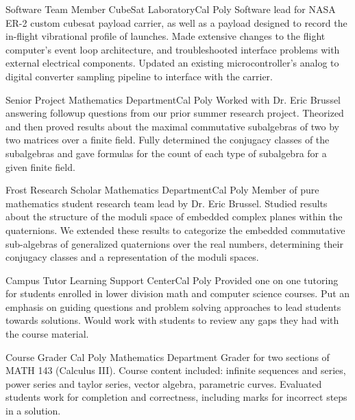 \documentclass[letterpaper, 11pt, sans]{moderncv}
\begin{document}
        {Software Team Member}
        {CubeSat Laboratory}{Cal Poly}{}
        {
            Software lead for NASA ER-2 custom cubesat payload carrier, as well as a payload designed to record the in-flight vibrational profile of launches.
            Made extensive changes to the flight computer's event loop architecture, and troubleshooted interface problems with external electrical components.
            Updated an existing microcontroller's analog to digital converter sampling pipeline to interface with the carrier.
        }

        {Senior Project}
        {Mathematics Department}{Cal Poly}{}
        {
            Worked with Dr. Eric Brussel answering followup questions from our prior summer research project.
            Theorized and then proved results about the maximal commutative subalgebras of two by two matrices over a finite field.
            Fully determined the conjugacy classes of the subalgebras and gave formulas for the count of each type of subalgebra for a given finite field.
        }

        {Frost Research Scholar}
        {Mathematics Department}{Cal Poly}{}
        {
            Member of pure mathematics student research team lead by Dr. Eric Brussel.
            Studied results about the structure of the moduli space of embedded complex planes within the quaternions.
            We extended these results to categorize the embedded commutative sub-algebras of generalized quaternions over the real numbers, determining their conjugacy classes and a representation of the moduli spaces.
        }

        {Campus Tutor}
        {Learning Support Center}{Cal Poly}{}
        {
            Provided one on one tutoring for students enrolled in lower division math and computer science courses.
            Put an emphasis on guiding questions and problem solving approaches to lead students towards solutions.
            Would work with students to review any gaps they had with the course material.
        }

        {Course Grader}
        {Cal Poly Mathematics Department}{}{}
        {
            Grader for two sections of MATH 143 (Calculus III).
            Course content included: infinite sequences and series, power series and taylor series, vector algebra, parametric curves.
            Evaluated students work for completion and correctness, including marks for incorrect steps in a solution.
        }
\end{document}
